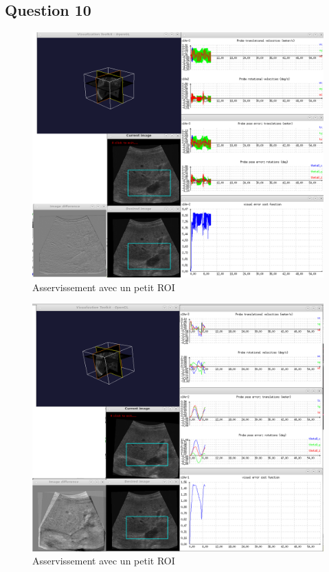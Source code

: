 \documentclass[a4paper,11pt]{article}
\begin{document}
\subsection{Question 10}
\begin{figure}[!h]
    \centering
    \includegraphics[width=1.0\textwidth]{./images/q10_big.png}
    \caption{Asservissement avec un petit ROI}
    \label{smallRoi}
\end{figure}

\begin{figure}[!h]
    \centering
    \includegraphics[width=1.0\textwidth]{./images/q10_small.png}
    \caption{Asservissement avec un petit ROI}
    \label{smallRoi}
\end{figure}
\end{document}
